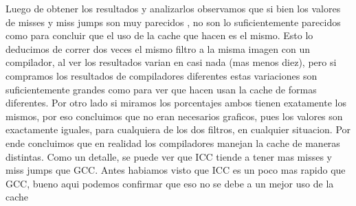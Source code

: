 Luego de obtener los resultados y analizarlos observamos que si bien los valores de misses y miss jumps son muy parecidos , no son lo suficientemente parecidos como para concluir que el uso de la cache que hacen es el mismo. Esto lo deducimos de correr dos veces el mismo filtro a la misma imagen con un compilador, al ver los resultados varian en  casi nada (mas menos diez), pero si compramos los resultados de compiladores diferentes estas variaciones son suficientemente grandes como para ver que hacen usan la cache de formas diferentes. Por otro lado si miramos los porcentajes ambos tienen exatamente los mismos, por eso concluimos que no eran necesarios graficos, pues los valores son exactamente iguales, para cualquiera de los dos filtros, en cualquier situacion. Por ende concluimos que en realidad los compiladores manejan la cache de maneras distintas. Como un detalle, se puede ver que ICC tiende a tener mas misses y miss jumps que GCC. Antes habiamos visto que ICC es un poco mas rapido que GCC, bueno aqui podemos confirmar que eso no se debe a un mejor uso de la cache